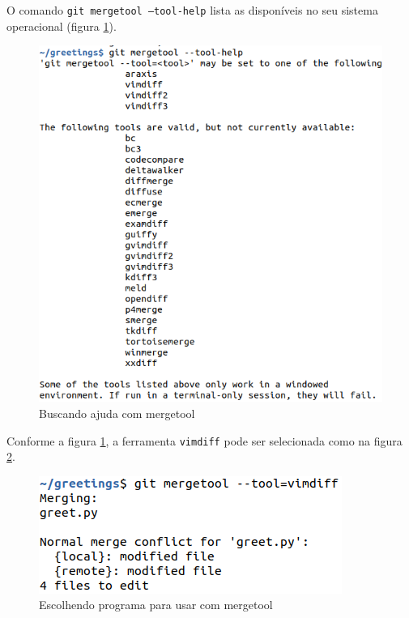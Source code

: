 \documentclass[a4paper]{book}
\begin{document}
O comando \texttt{git mergetool --tool-help}
lista as disponíveis no seu sistema operacional
(figura \ref{fig:54}).

\begin{figure}[!h]
\caption{Buscando ajuda com mergetool}
\label{fig:54}
\centering
\includegraphics[scale=0.6,left]{"images/54-Buscando ajuda com mergetool.png"}
\end{figure}

Conforme a figura \ref{fig:54}, a ferramenta \texttt{vimdiff}
pode ser selecionada como na figura \ref{fig:55}.

\begin{figure}[!h]
\caption{Escolhendo programa para usar com mergetool}
\label{fig:55}
\centering
\includegraphics[scale=0.6,left]{"images/55-Escolhendo programa para usar com mergetool.png"}
\end{figure}
\end{document}

